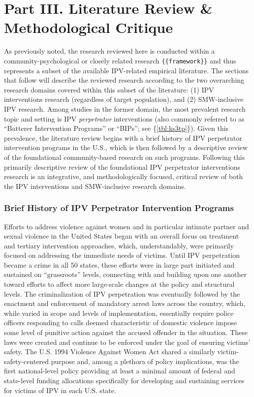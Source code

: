 \documentclass[11pt,]{tufte-book}
\begin{document}
\part{Part III. Literature Review \& Methodological Critique}

As previously noted, the research reviewed here is conducted within a
community-psychological or closely related research
\texttt{\{\{framework\}\}} and thus represents a subset of the available
IPV-related empirical literature. The sections that follow will describe
the reviewed research according to the two overarching research domains
covered within this subset of the literature: (1) IPV interventions
research (regardless of target population), and (2) SMW-inclusive IPV
research. Among studies in the former domain, the most prevalent
research topic and setting is IPV \emph{perpetrator} interventions (also
commonly referred to as ``Batterer Intervention Programs'' or ``BIPs'';
see \{\cref{tbl:ks3tp}\}). Given this prevalence, the
literature review begins with a brief history of IPV perpetrator
intervention programs in the U.S., which is then followed by a
descriptive review of the foundational community-based research on such
programs. Following this primarily descriptive review of the
foundational IPV perpetrator interventions research is an integrative,
and methodologically focused, critical review of both the IPV
interventions and SMW-inclusive research domains.

\section{Brief History of IPV Perpetrator Intervention
Programs}\label{brief-history-of-ipv-perpetrator-intervention-programs}

Efforts to address violence against women and in particular intimate
partner and sexual violence in the United States began with an overall
focus on treatment and tertiary intervention approaches, which,
understandably, were primarily focused on addressing the immediate needs
of victims. Until IPV perpetration became a crime in all 50 states,
these efforts were in large part initiated and sustained on
``grassroots'' levels, connecting with and building upon one another
toward efforts to affect more large-scale changes at the policy and
structural levels. The criminalization of IPV perpetration was
eventually followed by the enactment and enforcement of mandatory arrest
laws across the country, which, while varied in scope and levels of
implementation, essentially require police officers responding to calls
deemed characteristic of domestic violence impose some level of punitive
action against the accused offender in the situation. These laws were
created and continue to be enforced under the goal of ensuring victims'
safety. The U.S. 1994 Violence Against Women Act shared a similarly
victim-safety-centered purpose and, among a plethora of policy
implications, was the first national-level policy providing at least a
minimal amount of federal and state-level funding allocations
specifically for developing and sustaining services for victims of IPV
in each U.S. state.
\end{document}
